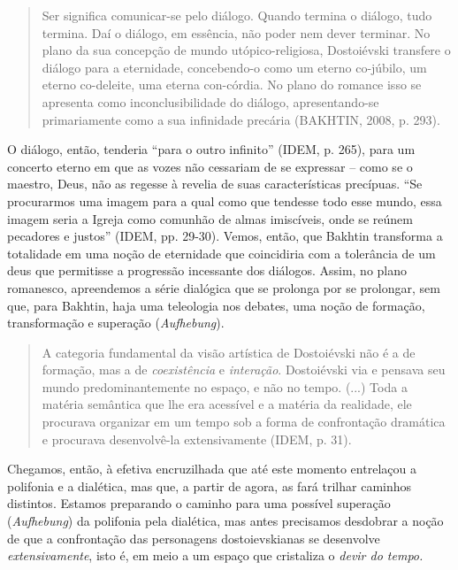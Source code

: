 \begin{quote}
Ser significa comunicar-se pelo diálogo. Quando termina o diálogo, tudo
termina. Daí o diálogo, em essência, não poder nem dever terminar. No
plano da sua concepção de mundo utópico-religiosa, Dostoiévski transfere
o diálogo para a eternidade, concebendo-o como um eterno co-júbilo, um
eterno co-deleite, uma eterna con-córdia. No plano do romance isso se
apresenta como inconclusibilidade do diálogo, apresentando-se
primariamente como a sua infinidade precária (BAKHTIN, 2008, p. 293).
\end{quote}

O diálogo, então, tenderia ``para o outro infinito'' (IDEM, p. 265),
para um concerto eterno em que as vozes não cessariam de se expressar --
como se o maestro, Deus, não as regesse à revelia de suas
características precípuas. ``Se procurarmos uma imagem para a qual como
que tendesse todo esse mundo, essa imagem seria a Igreja como comunhão
de almas imiscíveis, onde se reúnem pecadores e justos'' (IDEM, pp.
29-30). Vemos, então, que Bakhtin transforma a totalidade em uma noção
de eternidade que coincidiria com a tolerância de um deus que permitisse
a progressão incessante dos diálogos. Assim, no plano romanesco,
apreendemos a série dialógica que se prolonga por se prolongar, sem que,
para Bakhtin, haja uma teleologia nos debates, uma noção de formação,
transformação e superação (\emph{Aufhebung}).

\begin{quote}
A categoria fundamental da visão artística de Dostoiévski não é a de
formação, mas a de \emph{coexistência} e \emph{interação}. Dostoiévski
via e pensava seu mundo predominantemente no espaço, e não no tempo.
(...) Toda a matéria semântica que lhe era acessível e a matéria da
realidade, ele procurava organizar em um tempo sob a forma de
confrontação dramática e procurava desenvolvê-la extensivamente (IDEM,
p. 31).
\end{quote}

Chegamos, então, à efetiva encruzilhada que até este momento entrelaçou
a polifonia e a dialética, mas que, a partir de agora, as fará trilhar
caminhos distintos. Estamos preparando o caminho para uma possível
superação (\emph{Aufhebung}) da polifonia pela dialética, mas antes
precisamos desdobrar a noção de que a confrontação das personagens
dostoievskianas se desenvolve \emph{extensivamente}, isto é, em meio a
um espaço que cristaliza o \emph{devir do tempo.}

